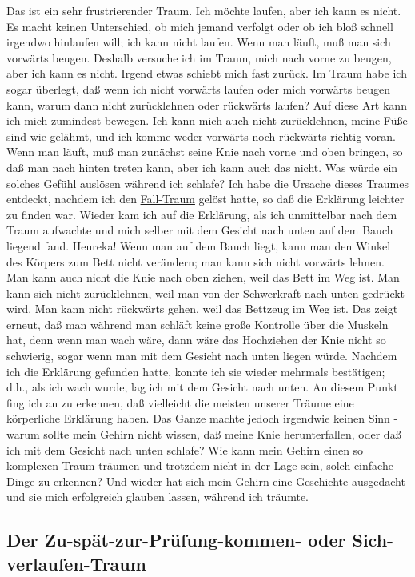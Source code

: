 Das ist ein sehr frustrierender Traum.
Ich möchte laufen, aber ich kann es nicht.
Es macht keinen Unterschied, ob mich jemand verfolgt oder ob ich bloß schnell irgendwo hinlaufen will; ich kann nicht laufen.
Wenn man läuft, muß man sich vorwärts beugen.
Deshalb versuche ich im Traum, mich nach vorne zu beugen, aber ich kann es nicht.
Irgend etwas schiebt mich fast zurück.
Im Traum habe ich sogar überlegt, daß wenn ich nicht vorwärts laufen oder mich vorwärts beugen kann, warum dann nicht zurücklehnen oder rückwärts laufen?
Auf diese Art kann ich mich zumindest bewegen.
Ich kann mich auch nicht zurücklehnen, meine Füße sind wie gelähmt, und ich komme weder vorwärts noch rückwärts richtig voran.
Wenn man läuft, muß man zunächst seine Knie nach vorne und oben bringen, so daß man nach hinten treten kann, aber ich kann auch das nicht.
Was würde ein solches Gefühl auslösen während ich schlafe?
Ich habe die Ursache dieses Traumes entdeckt, nachdem ich den \hyperlink{c3_5b}{Fall-Traum} gelöst hatte, so daß die Erklärung leichter zu finden war.
Wieder kam ich auf die Erklärung, als ich unmittelbar nach dem Traum aufwachte und mich selber mit dem Gesicht nach unten auf dem Bauch liegend fand. Heureka!
Wenn man auf dem Bauch liegt, kann man den Winkel des Körpers zum Bett nicht verändern; man kann sich nicht vorwärts lehnen.
Man kann auch nicht die Knie nach oben ziehen, weil das Bett im Weg ist.
Man kann sich nicht zurücklehnen, weil man von der Schwerkraft nach unten gedrückt wird.
Man kann nicht rückwärts gehen, weil das Bettzeug im Weg ist.
Das zeigt erneut, daß man während man schläft keine große Kontrolle über die Muskeln hat, denn wenn man wach wäre, dann wäre das Hochziehen der Knie nicht so schwierig, sogar wenn man mit dem Gesicht nach unten liegen würde.
Nachdem ich die Erklärung gefunden hatte, konnte ich sie wieder mehrmals bestätigen; d.h., als ich wach wurde, lag ich mit dem Gesicht nach unten.
An diesem Punkt fing ich an zu erkennen, daß vielleicht die meisten unserer Träume eine körperliche Erklärung haben.
Das Ganze machte jedoch irgendwie keinen Sinn - warum sollte mein Gehirn nicht wissen, daß meine Knie herunterfallen, oder daß ich mit dem Gesicht nach unten schlafe?
Wie kann mein Gehirn einen so komplexen Traum träumen und trotzdem nicht in der Lage sein, solch einfache Dinge zu erkennen?
Und wieder hat sich mein Gehirn eine Geschichte ausgedacht und sie mich erfolgreich glauben lassen, während ich träumte.


\subsection{Der Zu-spät-zur-Prüfung-kommen- oder Sich-verlaufen-Traum}\hypertarget{c3_5d}{}

